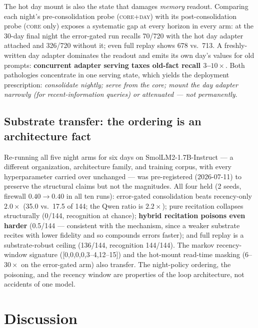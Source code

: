 \documentclass[11pt]{article}
\begin{document}
The hot day mount is also the state that damages \emph{memory} readout. Comparing each night's
pre-consolidation probe (\textsc{core+day}) with its post-consolidation probe (\textsc{core} only)
exposes a systematic gap at every horizon in every arm: at the 30-day final night the error-gated
run recalls 70/720 with the hot day adapter attached and 326/720 without it; even full replay shows
678 vs.\ 713. A freshly-written day adapter dominates the readout and emits its own day's values for
old prompts: \textbf{concurrent adapter serving taxes old-fact recall $3$--$10\times$}. Both
pathologies concentrate in one serving state, which yields the deployment prescription:
\emph{consolidate nightly; serve from the core; mount the day adapter narrowly (for
recent-information queries) or attenuated --- not permanently}.

\subsection{Substrate transfer: the ordering is an architecture fact}\label{sec:transfer}

Re-running all five night arms for six days on SmolLM2-1.7B-Instruct --- a different organization,
architecture family, and training corpus, with every hyperparameter carried over unchanged --- was
pre-registered (2026-07-11) to preserve the structural claims but not the magnitudes. All four
held (2 seeds, firewall $0.40\to0.40$ in all ten runs): error-gated consolidation beats recency-only
$2.0\times$ (35.0 vs.\ 17.5 of 144; the Qwen ratio is $2.2\times$); pure recitation collapses
structurally (0/144, recognition at chance); \textbf{hybrid recitation poisons even harder} (0.5/144
--- consistent with the mechanism, since a weaker substrate recites with lower fidelity and so
compounds errors faster); and full replay is a substrate-robust ceiling (136/144, recognition
144/144). The markov recency-window signature ([0,0,0,0,3--4,12--15]) and the hot-mount read-time
masking ($6$--$30\times$ on the error-gated arm) also transfer. The night-policy ordering, the
poisoning, and the recency window are properties of the loop architecture, not accidents of one
model.

\section{Discussion}\label{sec:discussion}
\end{document}
